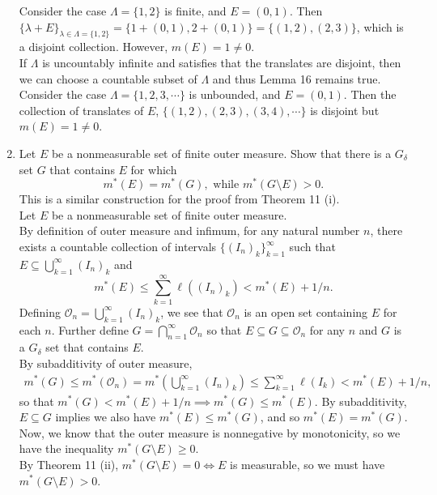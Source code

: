 \begin{enumerate}
	Consider the case $\Lambda=\{1,2\}$ is finite, and $E=(0,1)$. Then $\{\lambda+E\}_{\lambda\in\Lambda=\{1,2\}}=\{1+(0,1),2+(0,1)\}=\{(1,2),(2,3)\}$, which is a disjoint collection. However, $m(E)=1\neq0$.\\
	If $\Lambda$ is uncountably infinite and satisfies that the translates are disjoint, then we can choose a countable subset of $\Lambda$ and thus Lemma 16 remains true.\\
	Consider the case $\Lambda=\{1,2,3,\cdots\}$ is unbounded, and $E=(0,1)$. Then the collection of translates of $E$, $\{(1,2),(2,3),(3,4),\cdots\}$ is disjoint but $m(E)=1\neq0$.
	\item Let $E$ be a nonmeasurable set of finite outer measure. Show that there is a $G_\delta$ set $G$ that contains $E$ for which
	\[
		m^*(E)=m^*(G),\text{ while }m^*(G\setminus E)>0.
	\]
	This is a similar construction for the proof from Theorem 11 (i).\\
	Let $E$ be a nonmeasurable set of finite outer measure.\\
	By definition of outer measure and infimum, for any natural number $n$, there exists a countable collection of intervals $\{(I_n)_k\}_{k=1}^\infty$ such that $E\subseteq\bigcup_{k=1}^\infty (I_n)_k$ and
	\[
		m^*(E)\le\sum_{k=1}^\infty\ell((I_n)_k)<m^*(E)+1/n.	
	\]
	Defining $\mathcal{O}_n=\bigcup_{k=1}^\infty (I_n)_k$, we see that $\mathcal{O}_n$ is an open set containing $E$ for each $n$.
	Further define $G=\bigcap_{n=1}^\infty\mathcal{O}_n$ so that $E\subseteq G\subseteq\mathcal{O}_n$ for any $n$ and $G$ is a $G_\delta$ set that contains $E$.\\
	By subadditivity of outer measure,
	\begin{align*}
		m^*(G)\le m^*(\mathcal{O}_n)=m^*(\bigcup_{k=1}^\infty (I_n)_k)\le\sum_{k=1}^\infty\ell(I_k)<m^*(E)+1/n,
	\end{align*}
	so that $m^*(G)<m^*(E)+1/n\implies m^*(G)\le m^*(E)$.
	By subadditivity, $E\subseteq G$ implies we also have $m^*(E)\le m^*(G)$, and so $m^*(E)=m^*(G)$.\\
	Now, we know that the outer measure is nonnegative by monotonicity, so we have the inequality $m^*(G\setminus E)\ge0$.\\
	By Theorem 11 (ii), $m^*(G\setminus E)=0\iff E$ is measurable, so we must have $m^*(G\setminus E)>0$.
\end{enumerate}

